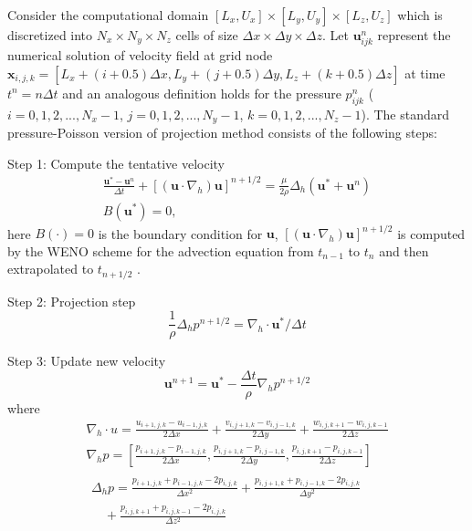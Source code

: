 Consider the computational domain $[L_x,U_x]\times[L_y,U_y]\times[L_z,U_z]$
which is discretized into $N_x\times N_y\times N_z$ cells of size $\Delta
x\times\Delta y\times\Delta z$. Let $\mathbf{u}^n_{ijk}$ represent the
numerical solution of velocity field at grid node  $\mathbf{x}_{i,j,k} =
[L_x+(i+0.5)\Delta x,L_y+(j+0.5)\Delta y, L_z+(k+0.5)\Delta z]$ at time $t^n =
n\Delta t$ and an analogous definition holds for the pressure $p^n_{ijk}$ ($i =
0,1,2,...,N_x-1$, $j = 0,1,2,...,N_y-1$, $k = 0,1,2,...,N_z-1$). The standard
pressure-Poisson version of projection method consists of the following steps:

Step 1: Compute the tentative velocity
\begin{eqnarray}
\frac{\mathbf{u}^*-\mathbf{u}^n}{\Delta t}+
[(\mathbf{u}\cdot\nabla_h)\mathbf{u}]^{n+1/2}
=\frac{\mu}{2\rho}\Delta_h(\mathbf{u}^*+\mathbf{u}^n)\\ B(\mathbf{u}^*) = 0,
\end{eqnarray} here $B(\cdot) = 0$ is the boundary condition for $\mathbf{u}$,
$[(\mathbf{u}\cdot\nabla_h)\mathbf{u}]^{n+1/2}$ is computed by the WENO scheme
\cite{WENO96} for the advection equation from $t_{n-1}$ to $t_{n}$ and then
extrapolated to $t_{n+1/2}$ \cite{KimMoin85}.

Step 2: Projection step
\begin{equation} \frac{1}{\rho}\Delta_h p^{n+1/2} =
\nabla_h\cdot \mathbf{u}^*/\Delta t \label{proj} \end{equation}

Step 3: Update new velocity
\begin{equation} \mathbf{u}^{n+1} = \mathbf{u}^* -
\frac{\Delta t}{\rho}\nabla_h p^{n+1/2} \label{newvel} \end{equation}
where
\begin{eqnarray} \label{divU} \nabla_h\cdot u =
\frac{u_{i+1,j,k}-u_{i-1,j,k}}{2\Delta x} +
\frac{v_{i,j+1,k}-v_{i,j-1,k}}{2\Delta y} +
\frac{w_{i,j,k+1}-w_{i,j,k-1}}{2\Delta z}\\ \label{gradP} \nabla_h p =
[\frac{p_{i+1,j,k}-p_{i-1,j,k}}{2\Delta x},
\frac{p_{i,j+1,k}-p_{i,j-1,k}}{2\Delta y},
\frac{p_{i,j,k+1}-p_{i,j,k-1}}{2\Delta z}]\\    \label{lapP} 
\begin{aligned}
\Delta_h p = \frac{p_{i+1,j,k}+p_{i-1,j,k}-2p_{i,j,k}}{\Delta x^2} +
\frac{p_{i,j+1,k}+p_{i,j-1,k}-2p_{i,j,k}}{\Delta y^2} \\ \quad
+\frac{p_{i,j,k+1}+p_{i,j,k-1}-2p_{i,j,k}}{\Delta z^2} \end{aligned}
\end{eqnarray}

